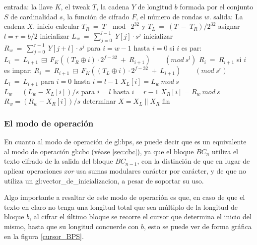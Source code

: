 \begin{pseudocodigo}[caption={Proceso de descifrado $BC^{-1}$.},
label={descifrado_BC}]
    entrada:    la llave $K$,
                el tweak $T$,
                la cadena $Y$ de longitud $b$ formada por el conjunto $S$
                  de cardinalidad $s$,
                la función de cifrado $F$,
                el número de rondas $w$.
    salida:     La cadena $X$.
    inicio
      calcular $T_R\: =\: T\: \mod\: 2^{32}$ y $T_L\: =\: (T\: -\: T_R) / 2^{32}$
      asignar $l = r = b/2$
      inicializar $L_w\: =\: \sum_{j=0}^{l-1}\: Y[j] \cdot s^j$
      inicializar $R_w\: =\: \sum_{j=0}^{r-1}\: Y[j+l] \cdot s^j$
      para $i=w-1$ hasta $i=0$
      si $i$ es par:
        $L_i\: =\: L_{i+1}\: \boxminus\: F_K((T_R \oplus i) \cdot 2^{f-32}\: +\: R_{i+1})\qquad (mod\ s^l)$
        $R_i\: =\: R_{i+1}$
      si $i$ es impar:
        $R_i\: =\: R_{i+1}\: \boxminus\: F_K((T_L \oplus i) \cdot 2^{f-32}\: +\: L_{i+1})\qquad (mod\ s^r)$
        $L_i\: =\: L_{i+1}$
      para $i=0$ hasta $i=l-1$
        $X_L[i] = L_w\ mod\ s$
        $L_w = (L_w - X_L[i])/s$
      para $i=l$ hasta $i=r-1$
        $X_R[i] = R_w\ mod\ s$
        $R_w = (R_w - X_R[i])/s$
      determinar $X = X_L \parallel X_R$
    fin
\end{pseudocodigo}


\subsubsection{El modo de operación}
\label{sec:bps_modo_operacion}

En cuanto al modo de operación de \gls{gl:bps}, se puede decir que es un
equivalente al modo de operación \gls{gl:cbc} (véase \ref{sec:cbc}), ya que el
bloque $BC_n$ utiliza el texto cifrado de la salida del bloque $BC_{n-1}$, con la
distinción de que en lugar de aplicar operaciones \textit{xor} usa sumas
modulares carácter por carácter, y de que no utiliza un
\gls{gl:vector_de_inicializacion}, a pesar de soportar su uso.


Algo importante a resaltar de este modo de operación es que, en caso de que el
texto en claro no tenga una longitud total que sea múltiplo de la longitud de
bloque $b$, al cifrar el último bloque se recorre el cursor que determina
el inicio del mismo, hasta que su longitud concuerde con $b$, esto se puede
ver de forma gráfica en la figura \ref{cursor_BPS}.

